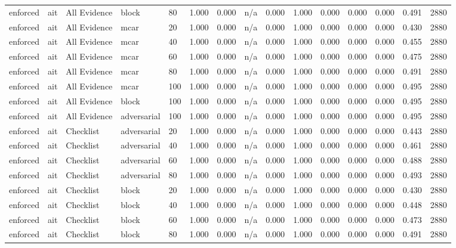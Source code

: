 \begin{table}[!ht]
{\begin{tabular}{lllllllllllllll}
enforced & ait & All Evidence & block & 80 & 1.000 & 0.000 & n/a & 0.000 & 1.000 & 0.000 & 0.000 & 0.000 & 0.491 & 2880 \\
enforced & ait & All Evidence & mcar & 20 & 1.000 & 0.000 & n/a & 0.000 & 1.000 & 0.000 & 0.000 & 0.000 & 0.430 & 2880 \\
enforced & ait & All Evidence & mcar & 40 & 1.000 & 0.000 & n/a & 0.000 & 1.000 & 0.000 & 0.000 & 0.000 & 0.455 & 2880 \\
enforced & ait & All Evidence & mcar & 60 & 1.000 & 0.000 & n/a & 0.000 & 1.000 & 0.000 & 0.000 & 0.000 & 0.475 & 2880 \\
enforced & ait & All Evidence & mcar & 80 & 1.000 & 0.000 & n/a & 0.000 & 1.000 & 0.000 & 0.000 & 0.000 & 0.491 & 2880 \\
enforced & ait & All Evidence & mcar & 100 & 1.000 & 0.000 & n/a & 0.000 & 1.000 & 0.000 & 0.000 & 0.000 & 0.495 & 2880 \\
enforced & ait & All Evidence & block & 100 & 1.000 & 0.000 & n/a & 0.000 & 1.000 & 0.000 & 0.000 & 0.000 & 0.495 & 2880 \\
enforced & ait & All Evidence & adversarial & 100 & 1.000 & 0.000 & n/a & 0.000 & 1.000 & 0.000 & 0.000 & 0.000 & 0.495 & 2880 \\
enforced & ait & Checklist & adversarial & 20 & 1.000 & 0.000 & n/a & 0.000 & 1.000 & 0.000 & 0.000 & 0.000 & 0.443 & 2880 \\
enforced & ait & Checklist & adversarial & 40 & 1.000 & 0.000 & n/a & 0.000 & 1.000 & 0.000 & 0.000 & 0.000 & 0.461 & 2880 \\
enforced & ait & Checklist & adversarial & 60 & 1.000 & 0.000 & n/a & 0.000 & 1.000 & 0.000 & 0.000 & 0.000 & 0.488 & 2880 \\
enforced & ait & Checklist & adversarial & 80 & 1.000 & 0.000 & n/a & 0.000 & 1.000 & 0.000 & 0.000 & 0.000 & 0.493 & 2880 \\
enforced & ait & Checklist & block & 20 & 1.000 & 0.000 & n/a & 0.000 & 1.000 & 0.000 & 0.000 & 0.000 & 0.430 & 2880 \\
enforced & ait & Checklist & block & 40 & 1.000 & 0.000 & n/a & 0.000 & 1.000 & 0.000 & 0.000 & 0.000 & 0.448 & 2880 \\
enforced & ait & Checklist & block & 60 & 1.000 & 0.000 & n/a & 0.000 & 1.000 & 0.000 & 0.000 & 0.000 & 0.473 & 2880 \\
enforced & ait & Checklist & block & 80 & 1.000 & 0.000 & n/a & 0.000 & 1.000 & 0.000 & 0.000 & 0.000 & 0.491 & 2880 \\

\end{tabular}}
\end{table}
